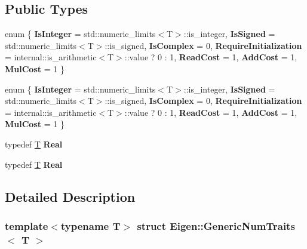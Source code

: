 \subsection*{Public Types}
\begin{DoxyCompactItemize}
\item 
\mbox{\label{struct_eigen_1_1_generic_num_traits_a4d39c941a6af4aa7807759cc8f19581e}} 
enum \{ \newline
{\bfseries Is\+Integer} = std\+:\+:numeric\+\_\+limits$<$T$>$\+:\+:is\+\_\+integer, 
{\bfseries Is\+Signed} = std\+:\+:numeric\+\_\+limits$<$T$>$\+:\+:is\+\_\+signed, 
{\bfseries Is\+Complex} = 0, 
{\bfseries Require\+Initialization} = internal\+:\+:is\+\_\+arithmetic$<$T$>$\+:\+:value ? 0 \+: 1, 
\newline
{\bfseries Read\+Cost} = 1, 
{\bfseries Add\+Cost} = 1, 
{\bfseries Mul\+Cost} = 1
 \}
\item 
\mbox{\label{struct_eigen_1_1_generic_num_traits_ae90e7f2742d358b41386f6bf0479d5ab}} 
enum \{ \newline
{\bfseries Is\+Integer} = std\+:\+:numeric\+\_\+limits$<$T$>$\+:\+:is\+\_\+integer, 
{\bfseries Is\+Signed} = std\+:\+:numeric\+\_\+limits$<$T$>$\+:\+:is\+\_\+signed, 
{\bfseries Is\+Complex} = 0, 
{\bfseries Require\+Initialization} = internal\+:\+:is\+\_\+arithmetic$<$T$>$\+:\+:value ? 0 \+: 1, 
\newline
{\bfseries Read\+Cost} = 1, 
{\bfseries Add\+Cost} = 1, 
{\bfseries Mul\+Cost} = 1
 \}
\item 
\mbox{\label{struct_eigen_1_1_generic_num_traits_abca8573812593670795c41f22aa9d5e2}} 
typedef \hyperlink{group___sparse_core___module}{T} {\bfseries Real}
\item 
\mbox{\label{struct_eigen_1_1_generic_num_traits_abca8573812593670795c41f22aa9d5e2}} 
typedef \hyperlink{group___sparse_core___module}{T} {\bfseries Real}
\end{DoxyCompactItemize}


\subsection{Detailed Description}
\subsubsection*{template$<$typename T$>$\newline
struct Eigen\+::\+Generic\+Num\+Traits$<$ T $>$}



